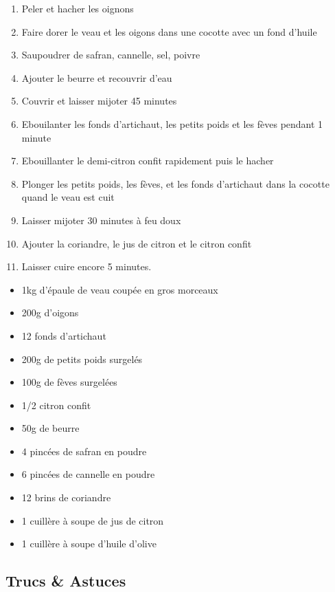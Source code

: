     \begin{minipage}{.7\textwidth}
        \begin{enumerate}
            \item Peler et hacher les oignons
	    \item Faire dorer le veau et les oigons dans une cocotte avec un fond d'huile
	    \item Saupoudrer de safran, cannelle, sel, poivre
	    \item Ajouter le beurre et recouvrir d'eau
	    \item Couvrir et laisser mijoter 45 minutes
	    \item Ebouilanter les fonds d'artichaut, les petits poids et les fèves pendant 1 minute
	    \item Ebouillanter le demi-citron confit rapidement puis le hacher
	    \item Plonger les petits poids, les fèves, et les fonds d'artichaut dans la cocotte quand le veau est cuit
	    \item Laisser mijoter 30 minutes à feu doux
	    \item Ajouter la coriandre, le jus de citron et le citron confit
	    \item Laisser cuire encore 5 minutes.

        \end{enumerate}
    \end{minipage}
    \begin{minipage}{.3\textwidth}
        \begin{flushleft}
        \begin{itemize}
            \item 1kg d'épaule de veau coupée en gros morceaux
	    \item 200g d'oigons
	    \item 12 fonds d'artichaut
	    \item 200g de petits poids surgelés
	    \item 100g de fèves surgelées
	    \item 1/2 citron confit
	    \item 50g de beurre
	    \item 4 pincées de safran en poudre
	    \item 6 pincées de cannelle en poudre
	    \item 12 brins de coriandre
	    \item 1 cuillère à soupe de jus de citron
	    \item 1 cuillère à soupe d'huile d'olive

        \end{itemize}
        \end{flushleft}
    \end{minipage}
    
    \vspace{1cm}
    \hline
    \vspace{1cm}
    
    \subsection{Trucs \& Astuces}
        
